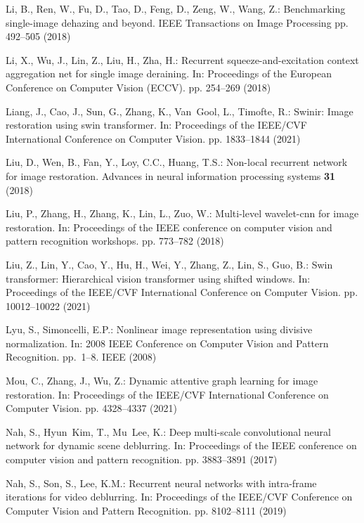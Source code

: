 \documentclass[runningheads]{llncs}
\begin{document}
\begin{thebibliography}{10}
Li, B., Ren, W., Fu, D., Tao, D., Feng, D., Zeng, W., Wang, Z.: Benchmarking
  single-image dehazing and beyond. IEEE Transactions on Image Processing pp.
  492--505 (2018)

Li, X., Wu, J., Lin, Z., Liu, H., Zha, H.: Recurrent squeeze-and-excitation
  context aggregation net for single image deraining. In: Proceedings of the
  European Conference on Computer Vision (ECCV). pp. 254--269 (2018)

Liang, J., Cao, J., Sun, G., Zhang, K., Van~Gool, L., Timofte, R.: Swinir:
  Image restoration using swin transformer. In: Proceedings of the IEEE/CVF
  International Conference on Computer Vision. pp. 1833--1844 (2021)

Liu, D., Wen, B., Fan, Y., Loy, C.C., Huang, T.S.: Non-local recurrent network
  for image restoration. Advances in neural information processing systems
  \textbf{31} (2018)

Liu, P., Zhang, H., Zhang, K., Lin, L., Zuo, W.: Multi-level wavelet-cnn for
  image restoration. In: Proceedings of the IEEE conference on computer vision
  and pattern recognition workshops. pp. 773--782 (2018)

Liu, Z., Lin, Y., Cao, Y., Hu, H., Wei, Y., Zhang, Z., Lin, S., Guo, B.: Swin
  transformer: Hierarchical vision transformer using shifted windows. In:
  Proceedings of the IEEE/CVF International Conference on Computer Vision. pp.
  10012--10022 (2021)

Lyu, S., Simoncelli, E.P.: Nonlinear image representation using divisive
  normalization. In: 2008 IEEE Conference on Computer Vision and Pattern
  Recognition. pp.~1--8. IEEE (2008)

Mou, C., Zhang, J., Wu, Z.: Dynamic attentive graph learning for image
  restoration. In: Proceedings of the IEEE/CVF International Conference on
  Computer Vision. pp. 4328--4337 (2021)

Nah, S., Hyun~Kim, T., Mu~Lee, K.: Deep multi-scale convolutional neural
  network for dynamic scene deblurring. In: Proceedings of the IEEE conference
  on computer vision and pattern recognition. pp. 3883--3891 (2017)

Nah, S., Son, S., Lee, K.M.: Recurrent neural networks with intra-frame
  iterations for video deblurring. In: Proceedings of the IEEE/CVF Conference
  on Computer Vision and Pattern Recognition. pp. 8102--8111 (2019)


\end{thebibliography}
\end{document}
